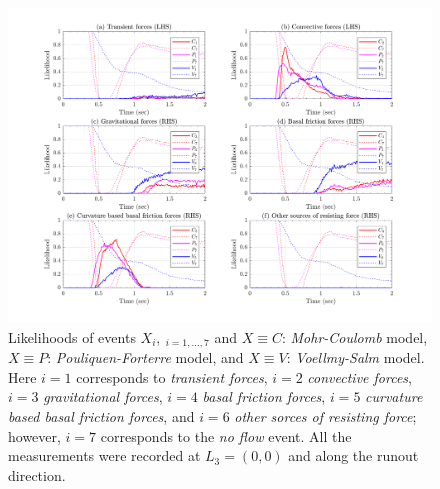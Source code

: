 \documentclass{article}
\begin{document}
\begin{figure}[H]
        \centering
        \includegraphics[width=1\textwidth]{InclinedPlane/LocalRecords/DominancePrX_L3.png}
        \caption{Likelihoods of events $X_i, \ _{i=1,...,7}$ and $X \equiv C$: \emph{Mohr-Coulomb} model, $X \equiv P$: \emph{Pouliquen-Forterre} model, and $X \equiv V$: \emph{Voellmy-Salm} model. Here $i=1$ corresponds to \emph{transient forces}, $i=2$ \emph{convective forces}, $i=3$ \emph{gravitational forces}, $i=4$ \emph{basal friction forces}, $i=5$ \emph{curvature based basal friction forces}, and $i=6$ \emph{other sorces of resisting force}; however, $i=7$ corresponds to the \emph{no flow} event. All the measurements were recorded at $L_3=(0,0)$ and along the runout direction.}
        \label{fig:Ramp-FXDominance-L3}
\end{figure}
\end{document}

